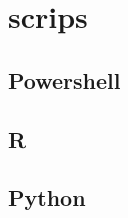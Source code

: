 \section{scrips}\label{apx:code}

\subsection{Powershell}\label{apx:code:datacollect}



\subsection{R}\label{apx:code:dataanal}



\subsection{Python}

\label{apx:code:datamod}